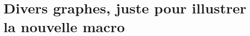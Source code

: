 
\chapter{Divers graphes, juste pour illustrer la nouvelle macro}
\label{graphes.ann}



















